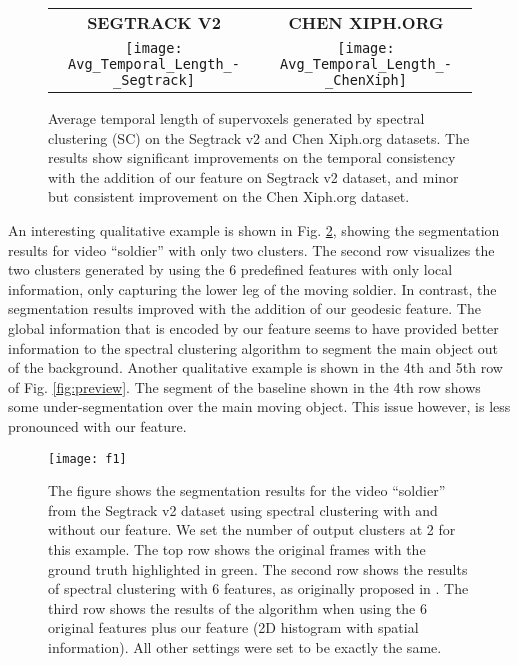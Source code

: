 \documentclass[runningheads]{llncs}
\begin{document}
\begin{figure}[h]
\begin{center}
\begin{adjustbox}{max width=0.9\textwidth }
\begin{tabular}{cc}
\textbf{SEGTRACK V2}&\textbf{\space CHEN XIPH.ORG}\\
\texttt{[image: Avg\_Temporal\_Length\_-\_Segtrack]}&
\texttt{[image: Avg\_Temporal\_Length\_-\_ChenXiph]}\\
\end{tabular}
\end{adjustbox}
\end{center}
\caption{ Average temporal length of supervoxels generated by spectral clustering (SC) \cite{Galasso2013} on the Segtrack v2 and Chen Xiph.org datasets. The results show significant improvements on the temporal consistency with the addition of our feature on Segtrack v2 dataset, and minor but consistent improvement on the Chen Xiph.org dataset.}
\label{tl}
\end{figure}

An interesting qualitative example is shown in Fig. \ref{fig:soldier}, showing the segmentation results for video ``soldier'' with only two clusters. The second row visualizes the two clusters generated by \cite{Galasso2013} using the 6 predefined features with only local information, only capturing the lower leg of the moving soldier. In contrast, the segmentation results improved with the addition of our geodesic feature. The global information that is encoded by our feature seems to have provided better information to the spectral clustering algorithm to segment the main object out of the background. %
Another qualitative example is shown in the 4th and 5th row of Fig.  \ref{fig:preview}. The segment of the baseline shown in the 4th row shows some under-segmentation over the main moving object. This issue however, is less pronounced with our feature. %

\begin{figure}[!t]
\begin{center}
\texttt{[image: f1]}
\end{center}
\caption{The figure shows the segmentation results for the video ``soldier'' from the Segtrack v2 dataset using  spectral clustering \cite{Galasso2013} with and without our feature. We set the number of output clusters at 2 for this example. The top row shows the original frames with the ground truth highlighted in green. The second row shows the results of spectral clustering with 6 features, as originally proposed in \cite{Galasso2013}. The third row shows the results of the algorithm when using the 6 original features plus our feature (2D histogram with spatial information). All other settings were set to be exactly the same.}
\label{fig:soldier}
\end{figure}
\end{document}
